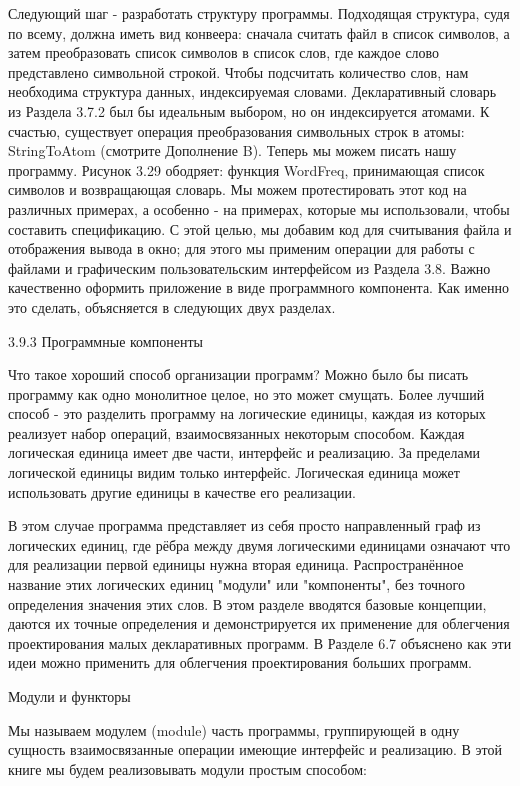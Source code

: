Следующий шаг - разработать структуру программы. Подходящая структура, судя по всему, должна иметь вид конвеера: сначала считать файл в список символов, а затем преобразовать список символов в список слов, где каждое слово представлено символьной строкой. Чтобы подсчитать количество слов, нам необходима структура данных, индексируемая словами. Декларативный словарь из Раздела 3.7.2 был бы идеальным выбором, но он индексируется атомами. К счастью, существует операция преобразования символьных строк в атомы: StringToAtom (смотрите Дополнение B). Теперь мы можем писать нашу программу. Рисунок 3.29 ободряет: функция WordFreq, принимающая список символов и возвращающая словарь. Мы можем протестировать этот код на различных примерах, а особенно - на примерах, которые мы использовали, чтобы составить спецификацию. С этой целью, мы добавим код для считывания файла и отображения вывода в окно; для этого мы применим операции для работы с файлами и графическим пользовательским интерфейсом из Раздела 3.8. Важно качественно оформить приложение в виде программного компонента. Как именно это сделать, объясняется в следующих двух разделах.

3.9.3 Программные компоненты

Что такое хороший способ организации программ? Можно было бы писать программу как одно монолитное целое, но это может смущать. Более лучший способ - это разделить программу на логические единицы, каждая из которых реализует набор операций, взаимосвязанных некоторым способом. Каждая логическая единица имеет две части, интерфейс и реализацию. За пределами логической единицы видим только интерфейс. Логическая единица может использовать другие единицы в качестве его реализации.

В этом случае программа представляет из себя просто направленный граф из логических единиц, где рёбра между двумя логическими единицами означают что для реализации первой единицы нужна вторая единица. Распространённое название этих логических единиц "модули" или "компоненты", без точного определения значения этих слов. В этом разделе вводятся базовые концепции, даются их точные определения и демонстрируется их применение для облегчения проектирования малых декларативных программ. В Разделе 6.7 объяснено как эти идеи можно применить для облегчения проектирования больших программ.

Модули и функторы

Мы называем модулем (module) часть программы, группирующей в одну сущность взаимосвязанные операции имеющие интерфейс и реализацию. В этой книге мы будем реализовывать модули простым способом:

